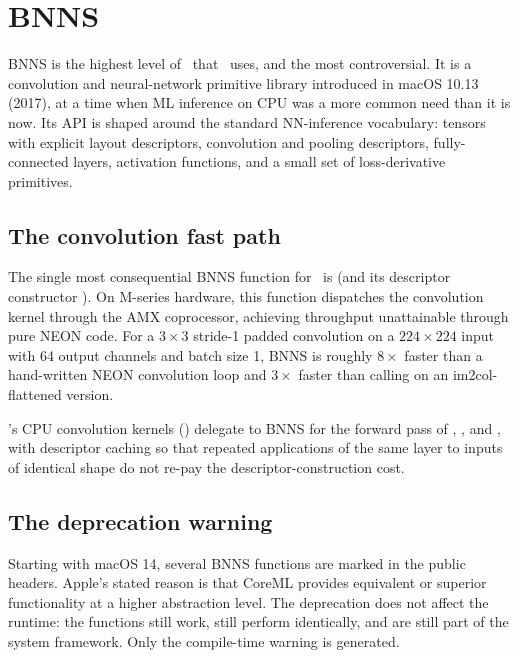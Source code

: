 \section{BNNS}
\label{sec:accelerate:bnns}

BNNS is the highest level of \Accelerate\ that \Lucid\ uses, and the
most controversial. It is a convolution and neural-network primitive
library introduced in macOS 10.13 (2017), at a time when ML inference
on CPU was a more common need than it is now. Its API is shaped
around the standard NN-inference vocabulary: tensors with
explicit layout descriptors, convolution and pooling descriptors,
fully-connected layers, activation functions, and a small set of
loss-derivative primitives.

\subsection{The convolution fast path}
\label{ssec:accelerate:bnns_conv}

The single most consequential BNNS function for \Lucid\ is
 (and its descriptor
constructor ). On
M-series hardware, this function dispatches the convolution kernel
through the AMX coprocessor, achieving throughput unattainable
through pure NEON code. For a $3 \times 3$ stride-1 padded
convolution on a $224 \times 224$ input with 64 output channels and
batch size 1, BNNS is roughly $8\times$ faster than a hand-written
NEON convolution loop and $3\times$ faster than calling
 on an im2col-flattened version.

\Lucid's CPU convolution kernels ()
delegate to BNNS for the forward pass of , ,
and , with descriptor caching so that repeated
applications of the same layer to inputs of identical shape do not
re-pay the descriptor-construction cost.

\subsection{The deprecation warning}
\label{ssec:accelerate:bnns_deprecation}

Starting with macOS 14, several BNNS functions are marked
 in the public headers. Apple's stated reason
is that CoreML provides equivalent or superior functionality at a
higher abstraction level. The deprecation does not affect the
runtime: the functions still work, still perform identically, and
are still part of the system framework. Only the compile-time
warning is generated.

